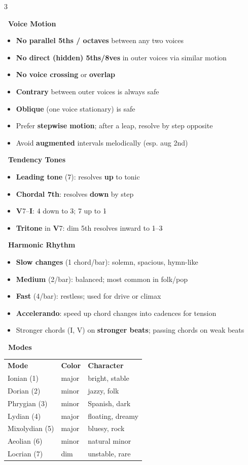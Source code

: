 \documentclass[letterpaper]{article}
\newcommand{\rn}[2]{\textbf{#1}#2}
\newcommand{\sect}[2]{%
  \noindent\begin{minipage}{\linewidth}%
  \colorbox{headerbg}{\color{white}\textbf{\ #1\ }}\par
  \vspace{1mm}
  #2
  \end{minipage}\par\vspace{2.5mm}%
}
\begin{document}
\begin{multicols}{3}
\sect{Voice Motion}{%
\begin{itemize}
  \item \textbf{No parallel 5ths / octaves} between any two voices
  \item \textbf{No direct (hidden) 5ths/8ves} in outer voices via similar motion
  \item \textbf{No voice crossing} or \textbf{overlap}
  \item \textbf{Contrary} between outer voices is always safe
  \item \textbf{Oblique} (one voice stationary) is safe
  \item Prefer \textbf{stepwise motion}; after a leap, resolve by step opposite
  \item Avoid \textbf{augmented} intervals melodically (esp. aug 2nd)
\end{itemize}%
}

\sect{Tendency Tones}{%
\begin{itemize}
  \item \textbf{Leading tone} (7\(\hat{}\)): resolves \textbf{up} to tonic
  \item \textbf{Chordal 7th}: resolves \textbf{down} by step
  \item \rn{V}{7}--\rn{I}{}: 4\(\hat{}\) down to 3\(\hat{}\); 7\(\hat{}\) up to 1\(\hat{}\)
  \item \textbf{Tritone} in \rn{V}{7}: dim 5th resolves inward to 1\(\hat{}\)--3\(\hat{}\)
\end{itemize}%
}

\sect{Harmonic Rhythm}{%
\begin{itemize}
  \item \textbf{Slow changes} (1 chord/bar): solemn, spacious, hymn-like
  \item \textbf{Medium} (2/bar): balanced; most common in folk/pop
  \item \textbf{Fast} (4/bar): restless; used for drive or climax
  \item \textbf{Accelerando}: speed up chord changes into cadences for tension
  \item Stronger chords (I, V) on \textbf{stronger beats}; passing chords on weak beats
\end{itemize}%
}

\sect{Modes}{%
\renewcommand{\arraystretch}{1.1}
\setlength{\tabcolsep}{3pt}
\begin{tabular}{@{}lll@{}}
\textbf{Mode} & \textbf{Color} & \textbf{Character} \\
Ionian (1) & major & bright, stable \\
Dorian (2) & minor & jazzy, folk \\
Phrygian (3) & minor & Spanish, dark \\
Lydian (4) & major & floating, dreamy \\
Mixolydian (5) & major & bluesy, rock \\
Aeolian (6) & minor & natural minor \\
Locrian (7) & dim & unstable, rare \\
\end{tabular}%
}


\end{multicols}
\end{document}
